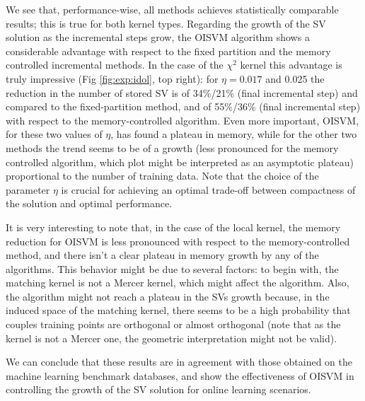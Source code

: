 We see that, performance-wise, all methods achieves statistically comparable results; this
is true for both kernel types. Regarding the growth of the SV solution as the incremental
steps grow, the OISVM algorithm shows a considerable advantage with respect to the fixed partition
and the memory controlled incremental methods. In the case of the $\chi^{2}$
kernel this advantage is truly impressive (Fig \ref{fig:exp:idol}, top right): for $\eta=0.017$ 
and 0.025 the reduction in the number of stored SV is of 34\%/21\% (final incremental step) 
and compared to the fixed-partition method, and of 55\%/36\% (final incremental step) with
respect to the memory-controlled algorithm. Even more important, OISVM, for these two 
values of $\eta$, has found a plateau in memory, while for the other two methods
the trend seems to be of a growth (less pronounced for the memory controlled algorithm,
which plot might be interpreted as an asymptotic plateau) proportional to 
the number of training data. Note that the choice of the parameter $\eta$ is crucial for
achieving an optimal trade-off between compactness of the solution and optimal performance.  

It is very interesting to note that, in the case of the local kernel, the memory reduction
for OISVM is less pronounced with respect to the memory-controlled method, and there isn't a clear 
plateau in memory growth by any of the algorithms. 
This behavior might be due to several factors: to begin with,
the matching kernel is not a Mercer kernel, 
which might affect the algorithm. Also,
the algorithm might not 
reach a plateau in the SVs growth because, in the induced space of
the matching kernel,  there seems to be a high probability that couples
training points are orthogonal or almost orthogonal (note that as the kernel
is not a Mercer one, the geometric interpretation might not be valid).

We can conclude that these results are in agreement with those obtained on the
machine learning benchmark databases, and show the effectiveness of OISVM in
controlling the growth of the SV solution for online learning scenarios.



